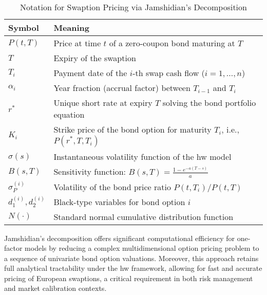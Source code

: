 \begin{table}[H]
	\centering
	\caption{Notation for Swaption Pricing via Jamshidian's Decomposition}
	\begin{tabular}{ll}
		\toprule
		\textbf{Symbol}        & \textbf{Meaning}                                                           \\
		\midrule
		$P(t, T)$              & Price at time $t$ of a zero-coupon bond maturing at $T$                    \\
		$T$                    & Expiry of the swaption                                                     \\
		$T_i$                  & Payment date of the $i$-th swap cash flow ($i = 1, \dots, n$)              \\
		$\alpha_i$             & Year fraction (accrual factor) between $T_{i-1}$ and $T_i$                 \\
		$r^*$                  & Unique short rate at expiry $T$ solving the bond portfolio equation        \\
		$K_i$                  & Strike price of the bond option for maturity $T_i$, i.e., $P(r^*, T, T_i)$ \\
		$\sigma(s)$            & Instantaneous volatility function of the \ac{hw} model                  \\
		$B(s, T)$              & Sensitivity function: $B(s, T) = \frac{1 - e^{-a(T - s)}}{a}$              \\
		$\sigma_P^{(i)}$       & Volatility of the bond price ratio $P(t, T_i)/P(t, T)$                     \\
		$d_1^{(i)}, d_2^{(i)}$ & Black-type variables for bond option $i$                                   \\
		$N(\cdot)$             & Standard normal cumulative distribution function                           \\
		\bottomrule
	\end{tabular}
\end{table}

Jamshidian's decomposition offers significant computational efficiency for one-factor models by reducing a complex multidimensional option pricing problem to a sequence of univariate bond option valuations. Moreover, this approach retains full analytical tractability under the \ac{hw} framework, allowing for fast and accurate pricing of European swaptions, a critical requirement in both risk management and market calibration contexts.

